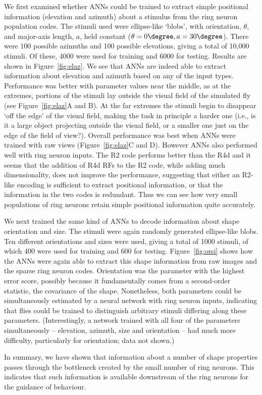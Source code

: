 We first examined whether ANNs could be trained to extract simple positional information (elevation and azimuth) about a stimulus from the ring neuron population codes. 
The stimuli used were ellipse-like `blobs', with orientation, $\theta$, and major-axis length, $a$, held constant ($\theta = 0\degree, a = 30\degree$).
There were 100 possible azimuths and 100 possible elevations, giving a total of 10,000 stimuli.
Of these, 4000 were used for training and 6000 for testing.
Results are shown in Figure~\ref{fig:elaz}.
We see that ANNs are indeed able to extract information about elevation and azimuth based on any of the input types.
Performance was better with parameter values near the middle, as at the extremes, portions of the stimuli lay outside the visual field of the simulated fly (see Figure~\ref{fig:elaz}A and B).
At the far extremes the stimuli begin to disappear `off the edge' of the visual field, making the task in principle a harder one (i.e., is it a large object projecting outside the visual field, or a smaller one just on the edge of the field of view?).
Overall performance was best when ANNs were trained with raw views (Figure~\ref{fig:elaz}C and D). However ANNs also performed well with ring neuron inputs. The R2 code performs better than the R4d and it seems that the addition of R4d \acp{RF} to the R2 code, while adding much dimensionality, does not improve the performance, suggesting that either an R2-like encoding is sufficient to extract positional information, or that the information in the two codes is redundant. Thus we can see how very small populations of ring neurons retain simple positional information quite accurately.

%

We next trained the same kind of ANNs to decode information about shape orientation and size. The stimuli were again randomly generated ellipse-like blobs. Ten different orientations and sizes were used, giving a total of 1000 stimuli, of which 400 were used for training and 600 for testing. Figure~\ref{fig:orsi} shows how the ANNs were again able to extract this shape information from raw images and the sparse ring neuron codes. Orientation was the parameter with the highest error score, possibly because it fundamentally comes from a second-order statistic, the covariance of the shape. Nonetheless, both parameters could be simultaneously estimated by a neural network with ring neuron inputs, indicating that flies could be trained to distinguish arbitrary stimuli differing along these parameters.
(Interestingly, a network trained with all four of the parameters simultaneously -- elevation, azimuth, size and orientation -- had much more difficulty, particularly for orientation; data not shown.)

%

In summary, we have shown that information about a number of shape properties passes through the bottleneck created by the small number of ring neurons.
This indicates that such information is available downstream of the ring neurons for the guidance of behaviour.
